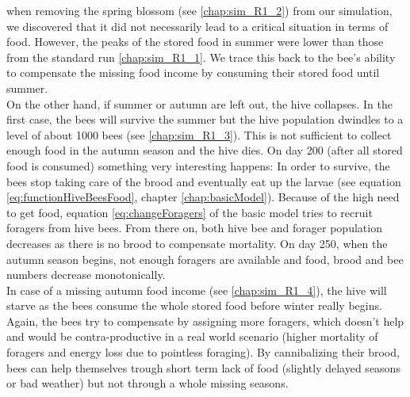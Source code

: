 		when removing the spring blossom (see \ref{chap:sim_R1_2}) from our simulation, we discovered that it did not necessarily lead to a critical situation in terms of food. However, the peaks of the stored food in summer were lower than those from the standard run \ref{chap:sim_R1_1}. We trace this back to the bee's ability to compensate the missing food income by consuming their stored food until summer.\\
		
		On the other hand, if summer or autumn are left out, the hive collapses. In the first case, the bees will survive the summer but the hive population dwindles to a level of about 1000 bees (see \ref{chap:sim_R1_3}). This is not sufficient to collect enough food in the autumn season and the hive dies. On day 200 (after all stored food is consumed) something very interesting happens: In order to survive, the bees stop taking care of the brood and eventually eat up the larvae (see equation \ref{eq:functionHiveBeesFood}, chapter \ref{chap:basicModel}). Because of the high need to get food, equation \ref{eq:changeForagers} of the basic model tries to recruit foragers from hive bees. From there on, both hive bee and forager population decreases as there is no brood to compensate mortality. On day 250, when the autumn season begins, not enough foragers are available and food, brood and bee numbers decrease monotonically.\\
		
		In case of a missing autumn food income (see \ref{chap:sim_R1_4}), the hive will starve as the bees consume the whole stored food before winter really begins. Again, the bees try to compensate by assigning more foragers, which doesn't help and would be contra-productive in a real world scenario (higher mortality of foragers and energy loss due to pointless foraging).
		By cannibalizing their brood, bees can help themselves trough short term lack of food (slightly delayed seasons or bad weather) but not through a whole missing seasons.
		
